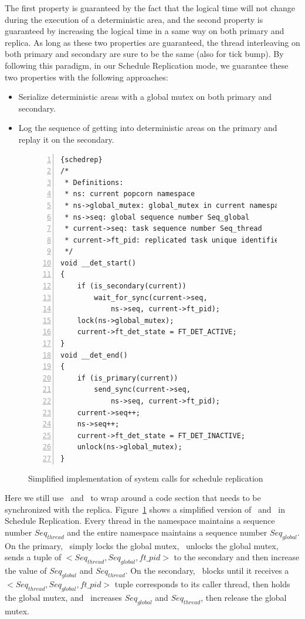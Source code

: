 The first property is guaranteed by the fact that the logical time will not change during the execution of a deterministic area, and the second property is guaranteed by increasing the logical time in a same way on both primary and replica. As long as these two properties are guaranteed, the thread interleaving on both primary and secondary are sure to be the same (also for tick bump). By following this paradigm, in our Schedule Replication mode, we guarantee these two properties with the following approaches:

\begin{itemize}
\item Serialize deterministic areas with a global mutex on both primary and secondary.
\item Log the sequence of getting into deterministic areas on the primary and replay it on the secondary.
\end{itemize}

\begin{figure}
\begin{lstlisting}[numbers=left, frame=single, basicstyle=\small, breaklines]{schedrep}
/*
 * Definitions:
 * ns: current popcorn namespace
 * ns->global_mutex: global_mutex in current namespace
 * ns->seq: global sequence number Seq_global
 * current->seq: task sequence number Seq_thread
 * current->ft_pid: replicated task unique identifier
 */
void __det_start()
{
    if (is_secondary(current))
        wait_for_sync(current->seq, 
            ns->seq, current->ft_pid);
    lock(ns->global_mutex);
    current->ft_det_state = FT_DET_ACTIVE;
}
void __det_end()
{
    if (is_primary(current))
        send_sync(current->seq, 
            ns->seq, current->ft_pid);
    current->seq++;
    ns->seq++;
    current->ft_det_state = FT_DET_INACTIVE;
    unlock(ns->global_mutex);
}
\end{lstlisting}
\caption{Simplified implementation of system calls for schedule replication}
\label{f:schedrep_c}
\end{figure}


Here we still use \detstart\ and \detend\ to wrap around a code section that needs to be synchronized with the replica. Figure~\ref{f:schedrep_c} shows a simplified version of \detstart\ and \detend\ in Schedule Replication.  Every thread in the namespace maintains a sequence number $Seq_{thread}$ and the entire namespace maintains a sequence number $Seq_{global}$. On the primary, \detstart\ simply locks the global mutex, \detend\ unlocks the global mutex, sends a tuple of $< Seq_{thread}, Seq_{global}, ft\_pid >$ to the secondary and then increase the value of $Seq_{global}$ and $Seq_{thread}$. On the secondary, \detstart\ blocks until it receives a $< Seq_{thread}, Seq_{global}, ft\_pid >$ tuple corresponds to its caller thread, then holds the global mutex, and \detend\ increases $Seq_{global}$ and $Seq_{thread}$, then release the global mutex.


